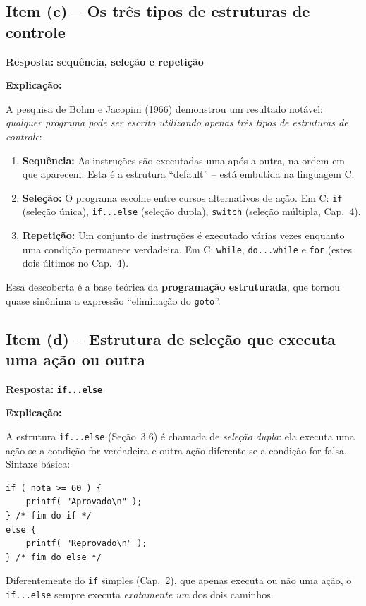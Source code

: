 \documentclass[12pt,a4paper]{article}
\begin{document}
\subsection*{Item (c) -- Os três tipos de estruturas de controle}

\begin{respostabox}
\textbf{Resposta:} \textcolor{deitelblue}{\textbf{sequência, seleção e repetição}}

\medskip\textbf{Explicação:}

A pesquisa de Bohm e Jacopini (1966) demonstrou um resultado notável: \textit{qualquer
programa pode ser escrito utilizando apenas três tipos de estruturas de controle}:

\begin{enumerate}
  \item \textbf{Sequência:} As instruções são executadas uma após a outra, na ordem
  em que aparecem. Esta é a estrutura ``default'' -- está embutida na linguagem C.
  \item \textbf{Seleção:} O programa escolhe entre cursos alternativos de ação.
  Em C: \texttt{if} (seleção única), \texttt{if...else} (seleção dupla),
  \texttt{switch} (seleção múltipla, Cap.~4).
  \item \textbf{Repetição:} Um conjunto de instruções é executado várias vezes
  enquanto uma condição permanece verdadeira. Em C: \texttt{while},
  \texttt{do...while} e \texttt{for} (estes dois últimos no Cap.~4).
\end{enumerate}

Essa descoberta é a base teórica da \textbf{programação estruturada}, que tornou
quase sinônima a expressão ``eliminação do \texttt{goto}''.
\end{respostabox}

\subsection*{Item (d) -- Estrutura de seleção que executa uma ação ou outra}

\begin{respostabox}
\textbf{Resposta:} \textcolor{deitelblue}{\textbf{\texttt{if...else}}}

\medskip\textbf{Explicação:}

A estrutura \texttt{if...else} (Seção~3.6) é chamada de \textit{seleção dupla}:
ela executa uma ação se a condição for verdadeira e outra ação diferente se a
condição for falsa. Sintaxe básica:

\begin{lstlisting}
if ( nota >= 60 ) {
    printf( "Aprovado\n" );
} /* fim do if */
else {
    printf( "Reprovado\n" );
} /* fim do else */
\end{lstlisting}

Diferentemente do \texttt{if} simples (Cap.~2), que apenas executa ou não uma ação,
o \texttt{if...else} sempre executa \textit{exatamente um} dos dois caminhos.
\end{respostabox}
\end{document}
